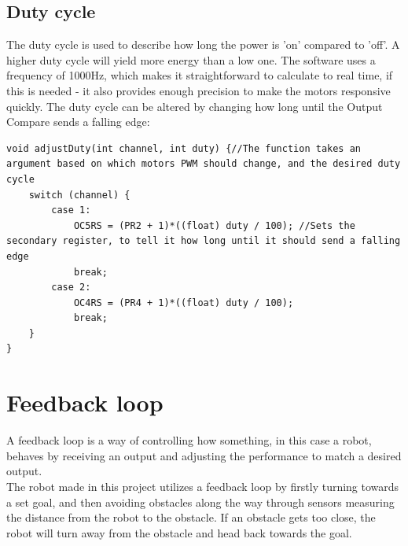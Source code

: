 \subsection {Duty cycle}

The duty cycle is used to describe how long the power is 'on' compared to 'off'. A higher duty cycle will yield more energy than a low one. The software uses a frequency of 1000Hz, which makes it straightforward to calculate to real time, if this is needed - it also provides enough precision to make the motors responsive quickly.
The duty cycle can be altered by changing how long until the Output Compare sends a falling edge:

\begin{lstlisting}
void adjustDuty(int channel, int duty) {//The function takes an argument based on which motors PWM should change, and the desired duty cycle
    switch (channel) { 
        case 1:
            OC5RS = (PR2 + 1)*((float) duty / 100); //Sets the secondary register, to tell it how long until it should send a falling edge
            break;
        case 2:
            OC4RS = (PR4 + 1)*((float) duty / 100);
            break;
    }
}
\end{lstlisting}

\section{Feedback loop}
A feedback loop is a way of controlling how something, in this case a robot, behaves by receiving an output and adjusting the performance to match a desired output.\\
The robot made in this project utilizes a feedback loop by firstly turning towards a set goal, and then avoiding obstacles along the way through sensors measuring the distance from the robot to the obstacle. If an obstacle gets too close, the robot will turn away from the obstacle and head back towards the goal.
\newpage
